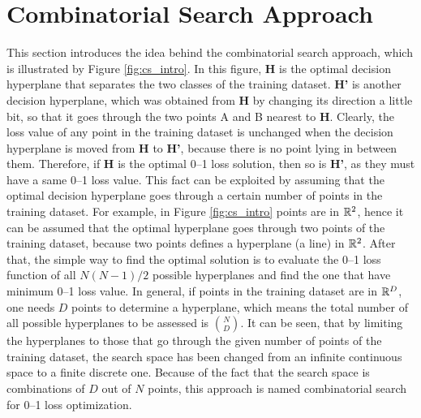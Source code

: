 \section{Combinatorial Search Approach}
\label{cha:combinatorialsearch}

This section introduces the idea behind the combinatorial search
approach, which is illustrated by Figure \ref{fig:cs_intro}. In this
figure, {\bf H} is the optimal decision hyperplane that separates the
two classes of the training dataset. {\bf H'} is another decision
hyperplane, which was obtained from {\bf H} by changing its direction
a little bit, so that it goes through the two points A and B nearest
to {\bf H}. Clearly, the loss value of any point in the training
dataset is unchanged when the decision hyperplane is moved from {\bf
  H} to {\bf H'}, because there is no point lying in between
them. Therefore, if {\bf H} is the optimal 0--1 loss solution, then so
is {\bf H'}, as they must have a same 0--1 loss value. This fact can
be exploited by assuming that the optimal decision hyperplane goes
through a certain number of points in the training dataset. For
example, in Figure \ref{fig:cs_intro} points are in $\mathbb{R}^2$, hence it
can be assumed that the optimal hyperplane goes through two points of
the training dataset, because two points defines a hyperplane (a line)
in $\mathbb{R}^2$. After that, the simple way to find the optimal solution is
to evaluate the 0--1 loss function of all $N(N-1)/2$ possible
hyperplanes and find the one that have minimum 0--1 loss value. In
general, if points in the training dataset are in $\mathbb{R}^D$, one needs
$D$ points to determine a hyperplane, which means the total number of
all possible hyperplanes to be assessed is ${N \choose D}$. It can be
seen, that by limiting the hyperplanes to those that go through the
given number of points of the training dataset, the search space has
been changed from an infinite continuous space to a finite discrete
one. Because of the fact that the search space is combinations of $D$
out of $N$ points, this approach is named combinatorial search for
0--1 loss optimization.

